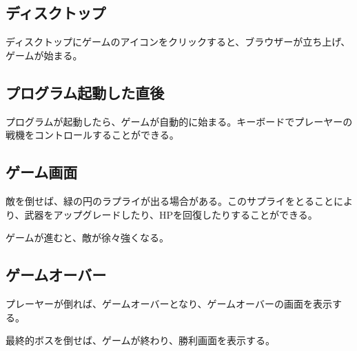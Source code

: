 \subsection{ディスクトップ}
	ディスクトップにゲームのアイコンをクリックすると、ブラウザーが立ち上げ、ゲームが始まる。
	
\subsection{プログラム起動した直後}
	プログラムが起動したら、ゲームが自動的に始まる。キーボードでプレーヤーの戦機をコントロールすることができる。
	
\subsection{ゲーム画面}
	敵を倒せば、緑の円のラプライが出る場合がある。このサプライをとることにより、武器をアップグレードしたり、HPを回復したりすることができる。
	
	ゲームが進むと、敵が徐々強くなる。
	
\subsection{ゲームオーバー}
	プレーヤーが倒れば、ゲームオーバーとなり、ゲームオーバーの画面を表示する。
	
	
	最終的ボスを倒せば、ゲームが終わり、勝利画面を表示する。
	
